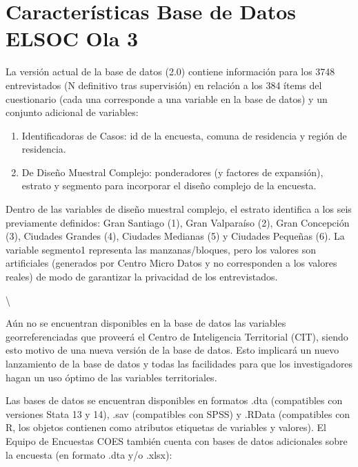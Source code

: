 \documentclass[
  openany]{book}
\begin{document}
\hypertarget{caracteruxedsticas-base-de-datos-elsoc-ola-3}{%
\section{Características Base de Datos ELSOC Ola 3}\label{caracteruxedsticas-base-de-datos-elsoc-ola-3}}

La versión actual de la base de datos (2.0) contiene información para los 3748 entrevistados (N definitivo tras supervisión) en relación a los 384 ítems del cuestionario (cada una corresponde a una variable en la base de datos) y un conjunto adicional de variables:

\begin{enumerate}
\def\labelenumi{\arabic{enumi}.}
\item
  Identificadoras de Casos: id de la encuesta, comuna de residencia y región de residencia.
\item
  De Diseño Muestral Complejo: ponderadores (y factores de expansión), estrato y segmento para incorporar el diseño complejo de la encuesta.
\end{enumerate}

Dentro de las variables de diseño muestral complejo, el estrato identifica a los seis previamente definidos: Gran Santiago (1), Gran Valparaíso (2), Gran Concepción (3), Ciudades Grandes (4), Ciudades Medianas (5) y Ciudades Pequeñas (6). La variable segmento1 representa las manzanas/bloques, pero los valores son artificiales (generados por Centro Micro Datos y no corresponden a los valores reales) de modo de garantizar la privacidad de los entrevistados.

\noindent {}\textbackslash{}

Aún no se encuentran disponibles en la base de datos las variables georreferenciadas que proveerá el Centro de Inteligencia Territorial (CIT), siendo esto motivo de una nueva versión de la base de datos. Esto implicará un nuevo lanzamiento de la base de datos y todas las facilidades para que los investigadores hagan un uso óptimo de las variables territoriales.

Las bases de datos se encuentran disponibles en formatos .dta (compatibles con versiones Stata 13 y 14), .sav (compatibles con SPSS) y .RData (compatibles con R, los objetos contienen como atributos etiquetas de variables y valores). El Equipo de Encuestas COES también cuenta con bases de datos adicionales sobre la encuesta (en formato .dta y/o .xlsx):
\end{document}
